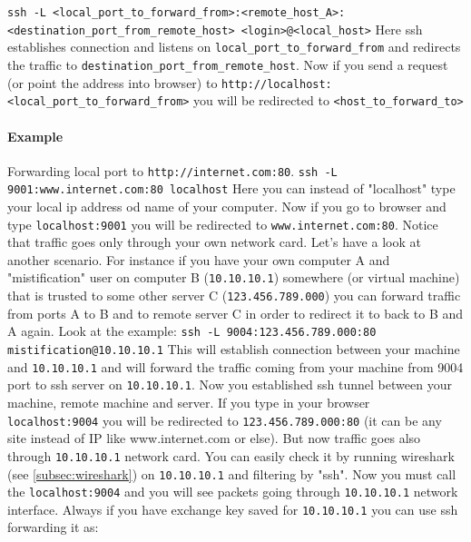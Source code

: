 \documentclass{article}[12pt]
\newcommand{\q}[1]{\texttt{#1}}
\begin{document}
{\texttt{ssh -L <local\_port\_to\_forward\_from>:<remote\_host\_A>:<destination\_port\_from\_remote\_host> <login>@<local\_host>} \newline\newline
Here ssh establishes connection and listens on \q{local\_port\_to\_forward\_from} and redirects the traffic to \q{destination\_port\_from\_remote\_host}.
Now if you send a request (or point the address into browser) to \q{http://localhost:<local\_port\_to\_forward\_from>} you will be redirected to \q{<host\_to\_forward\_to>}

\paragraph{Example} Forwarding local port to \q{http://internet.com:80}. \newline \newline
\texttt{ssh -L 9001:www.internet.com:80 localhost} \newline \newline
Here you can instead of "localhost" type your local ip address od name of your computer.
Now if you go to browser and type \q{localhost:9001} you will be redirected to \q{www.internet.com:80}.
Notice that traffic goes only through your own network card.
\newline
\newline
Let's have a look at another scenario.
For instance if you have your own computer A and "mistification" user on  computer B (\q{10.10.10.1}) somewhere (or virtual machine) that is trusted to some other server C (\q{123.456.789.000}) you can forward traffic from ports A to B and to remote server C in order to redirect it to back to B and A again.
Look at the example: \newline \newline
\texttt{ssh -L 9004:123.456.789.000:80 mistification@10.10.10.1} \newline \newline
This will establish connection between your machine and \q{10.10.10.1} and will forward the traffic coming from your machine from 9004 port to ssh server on \q{10.10.10.1}.
Now you established ssh tunnel between your machine, remote machine and server.
If you type in your browser \q{localhost:9004} you will be redirected to \q{123.456.789.000:80} (it can be any site instead of IP like www.internet.com or else).
But now traffic goes also through \q{10.10.10.1} network card.
You can easily check it by running wireshark (see \ref{subsec:wireshark}) on \q{10.10.10.1} and filtering by "ssh".
Now you must call the \q{localhost:9004} and you will see packets going through \q{10.10.10.1} network interface.
Always if you have exchange key saved for \q{10.10.10.1} you can use ssh forwarding it as:\newline \newline

}
\end{document}
